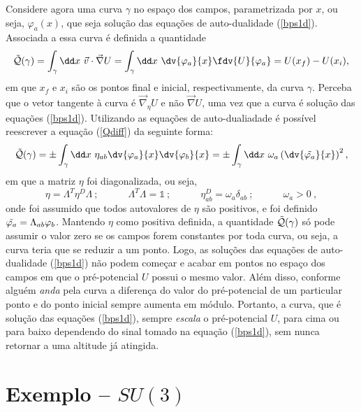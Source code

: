 Considere agora uma curva $\gamma$ no espaço dos campos, parametrizada por $x$, ou seja, $\varphi_a(x)$, que seja solução das equações de auto-dualidade (\ref{bps1d}). Associada a essa curva é definida a quantidade
\begin{equation}
    \Tilde{\mathcal{Q}}(\gamma) = \int_{\gamma}\dd x \ \Vec{v}\cdot\Vec{\nabla}U = \int_{\gamma}\dd x \ \dv{\varphi_a}{x}\fdv{U}{\varphi_a} = U(x_f) - U(x_i),
    \label{Qdiff}
\end{equation}
em que $x_f$ e $x_i$ são os pontos final e inicial, respectivamente, da curva $\gamma$. Perceba que o vetor tangente à curva é $\Vec{\nabla}_\eta U$ e não $\Vec{\nabla}U$, uma vez que a curva é solução das equações (\ref{bps1d}). Utilizando as equações de auto-dualiadade é possível reescrever a equação (\ref{Qdiff}) da seguinte forma:
\begin{equation}
    \Tilde{\mathcal{Q}}(\gamma) = \pm \int_{\gamma} \dd x \ \eta_{ab}\dv{\varphi_a}{x}\dv{\varphi_b}{x} = \pm \int_{\gamma} \dd x \ \omega_a \left(\dv{\tilde{\varphi_a}}{x} \right)^2,
\end{equation}
em que a matriz $\eta$ foi diagonalizada, ou seja, 
\begin{equation}
    \eta = \Lambda^{T}\eta^D\Lambda \ ; \qquad \quad \Lambda^T\Lambda = \mathbb{1} \ ; \quad\qquad \eta_{ab}^D = \omega_a\delta_{ab} \ ; \quad \qquad \omega_a > 0 \ ,
\end{equation}
onde foi assumido que todos autovalores de $\eta$ são positivos, e foi definido $\Tilde{\varphi_a} = \Lambda_{ab}\varphi_b$. Mantendo $\eta$ como positiva definida, a quantidade $\Tilde{\mathcal{Q}}(\gamma)$ só pode assumir o valor zero se os campos forem constantes por toda curva, ou seja, a curva teria que se reduzir a um ponto. Logo, as soluções das equações de auto-dualidade (\ref{bps1d}) não podem começar e acabar em pontos no espaço dos campos em que o pré-potencial $U$ possui o mesmo valor. Além disso, conforme alguém \textit{anda} pela curva a diferença do valor do pré-potencial de um particular ponto e do ponto inicial sempre aumenta em módulo. Portanto, a curva, que é solução das equações (\ref{bps1d}), sempre \textit{escala} o pré-potencial $U$, para cima ou para baixo dependendo do sinal tomado na equação (\ref{bps1d}), sem nunca retornar a uma altitude já atingida. 

\section{Exemplo -- $SU(3)$}

